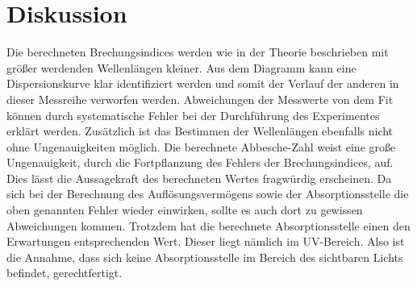 \section{Diskussion}
\label{sec:Diskussion}

Die berechneten Brechungsindices werden wie in der Theorie beschrieben mit größer werdenden Wellenlängen kleiner.
Aus dem Diagramm kann eine Dispersionskurve klar identifiziert werden und somit der Verlauf der anderen in dieser
Messreihe verworfen werden. Abweichungen der Messwerte von dem Fit können durch systematische Fehler bei der Durchführung des
Experimentes erklärt werden. Zusätzlich ist das Bestimmen der Wellenlängen ebenfalls nicht ohne Ungenauigkeiten möglich.
Die berechnete Abbesche-Zahl weist eine große Ungenauigkeit, durch die Fortpflanzung des Fehlers der Brechungsindices, auf. Dies lässt die
Aussagekraft des berechneten Wertes fragwürdig erscheinen.
Da sich bei der Berechnung des Auflösungsvermögens sowie der Absorptionsstelle die oben genannten Fehler wieder einwirken, sollte es
auch dort zu gewissen Abweichungen kommen. Trotzdem hat die berechnete Absorptionsstelle einen den Erwartungen entsprechenden Wert.
Dieser liegt nämlich im UV-Bereich. Also ist die Annahme, dass sich keine Absorptionsstelle im Bereich des sichtbaren Lichts befindet,
gerechtfertigt.
